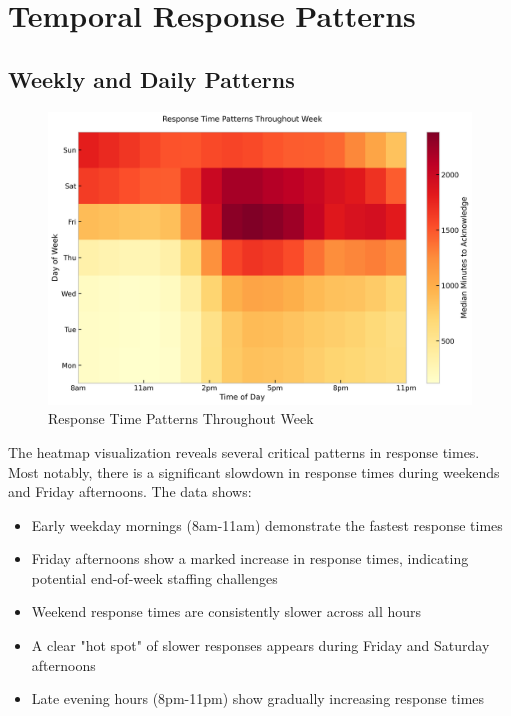\documentclass[12pt]{report}
\begin{document}
\section{Temporal Response Patterns}
\subsection{Weekly and Daily Patterns}

\begin{figure}[H]
\centering
\includegraphics[width=\textwidth]{response_time_heatmap}
\caption{Response Time Patterns Throughout Week}
\label{fig:response_patterns}
\end{figure}

The heatmap visualization reveals several critical patterns in response times. Most notably, there is a significant slowdown in response times during weekends and Friday afternoons. The data shows:

\begin{itemize}
    \item Early weekday mornings (8am-11am) demonstrate the fastest response times
    \item Friday afternoons show a marked increase in response times, indicating potential end-of-week staffing challenges
    \item Weekend response times are consistently slower across all hours
    \item A clear "hot spot" of slower responses appears during Friday and Saturday afternoons
    \item Late evening hours (8pm-11pm) show gradually increasing response times
\end{itemize}
\end{document}
